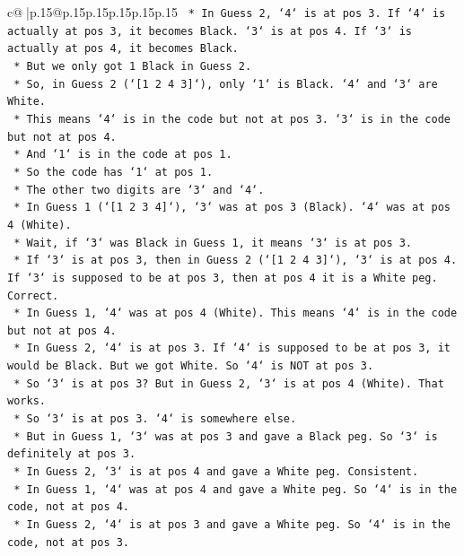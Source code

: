 \documentclass{article}
\begin{document}
{\begin{supertabular}{c@{$\;$}|p{.15\linewidth}@{}p{.15\linewidth}p{.15\linewidth}p{.15\linewidth}p{.15\linewidth}p{.15\linewidth}}
{{{\texttt{            *   In Guess 2, `4` is at pos 3. If `4` is actually at pos 3, it becomes Black. `3` is at pos 4. If `3` is actually at pos 4, it becomes Black.} \\
\texttt{            *   But we only got 1 Black in Guess 2.} \\
\texttt{            *   So, in Guess 2 (`{[}1 2 4 3{]}`), only `1` is Black. `4` and `3` are White.} \\
\texttt{            *   This means `4` is in the code but not at pos 3. `3` is in the code but not at pos 4.} \\
\texttt{            *   And `1` is in the code at pos 1.} \\
\texttt{            *   So the code has `1` at pos 1.} \\
\texttt{            *   The other two digits are `3` and `4`.} \\
\texttt{            *   In Guess 1 (`{[}1 2 3 4{]}`), `3` was at pos 3 (Black). `4` was at pos 4 (White).} \\
\texttt{            *   Wait, if `3` was Black in Guess 1, it means `3` is at pos 3.} \\
\texttt{            *   If `3` is at pos 3, then in Guess 2 (`{[}1 2 4 3{]}`), `3` is at pos 4. If `3` is supposed to be at pos 3, then at pos 4 it is a White peg. Correct.} \\
\texttt{            *   In Guess 1, `4` was at pos 4 (White). This means `4` is in the code but not at pos 4.} \\
\texttt{            *   In Guess 2, `4` is at pos 3. If `4` is supposed to be at pos 3, it would be Black. But we got White. So `4` is NOT at pos 3.} \\
\texttt{            *   So `3` is at pos 3? But in Guess 2, `3` is at pos 4 (White). That works.} \\
\texttt{            *   So `3` is at pos 3. `4` is somewhere else.} \\
\texttt{            *   But in Guess 1, `3` was at pos 3 and gave a Black peg. So `3` is definitely at pos 3.} \\
\texttt{            *   In Guess 2, `3` is at pos 4 and gave a White peg. Consistent.} \\
\texttt{            *   In Guess 1, `4` was at pos 4 and gave a White peg. So `4` is in the code, not at pos 4.} \\
\texttt{            *   In Guess 2, `4` is at pos 3 and gave a White peg. So `4` is in the code, not at pos 3.} \\
}}}
\end{supertabular}}
\end{document}

